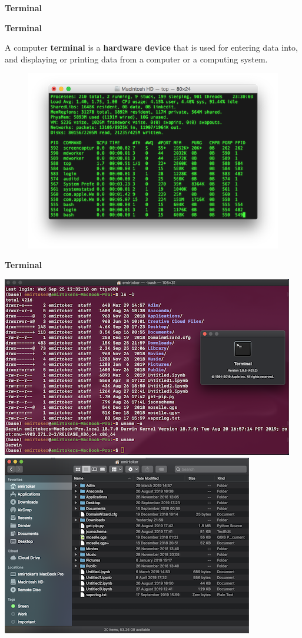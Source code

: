 \documentclass[ignorenonframetext,]{beamer}
\begin{document}
\begin{frame}{\textbf{Terminal}}

\begin{block}{\textbf{Terminal}}

A computer \textbf{terminal} is a \textbf{hardware device} that is used
for entering data into, and displaying or printing data from a computer
or a computing system.

\begin{figure}
\centering
\includegraphics{terminal0.png}
\caption{}
\end{figure}

\end{block}

\begin{block}{\textbf{Terminal}}

\includegraphics{terminal.png} \includegraphics{terminal1.png}


\end{block}
\end{frame}
\end{document}
